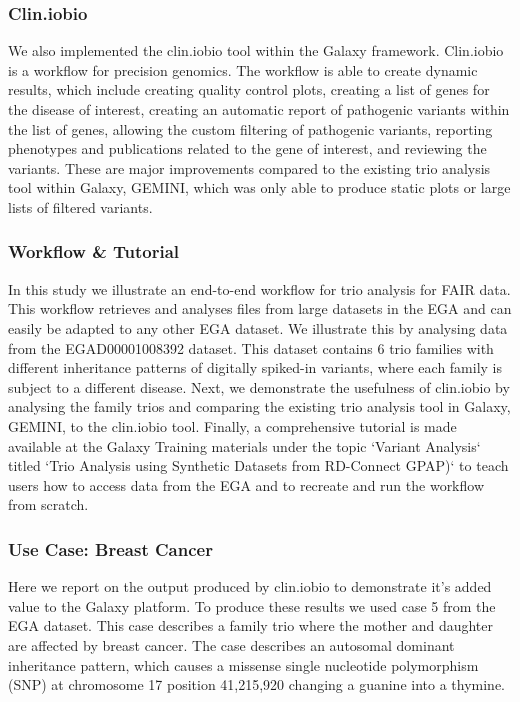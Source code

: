 \subsubsection*{Clin.iobio}
We also implemented the clin.iobio tool within the Galaxy framework. Clin.iobio is a workflow for precision genomics. The workflow is able to create dynamic results, which include creating quality control plots, creating a list of genes for the disease of interest, creating an automatic report of pathogenic variants within the list of genes, allowing the custom filtering of pathogenic variants, reporting phenotypes and publications related to the gene of interest, and reviewing the variants. These are major improvements compared to the existing trio analysis tool within Galaxy, GEMINI, which was only able to produce static plots or large lists of filtered variants.

\subsubsection*{Workflow \& Tutorial}
In this study we illustrate an end-to-end workflow for trio analysis for FAIR data. This workflow retrieves and analyses files from large datasets in the EGA and can easily be adapted to any other EGA dataset. We illustrate this by analysing data from the EGAD00001008392 \cite{egad} dataset. This dataset contains 6 trio families with different inheritance patterns of digitally spiked-in variants, where each family is subject to a different disease. Next, we demonstrate the usefulness of clin.iobio by analysing the family trios and comparing the existing trio analysis tool in Galaxy, GEMINI, to the clin.iobio tool. Finally, a comprehensive tutorial is made available at the Galaxy Training materials \cite{GTN} under the topic `Variant Analysis` titled `Trio Analysis using Synthetic Datasets from RD-Connect GPAP)` \cite{tutorial} to teach users how to access data from the EGA and to recreate and run the workflow from scratch.

\subsubsection*{Use Case: Breast Cancer}
Here we report on the output produced by clin.iobio to demonstrate it's added value to the Galaxy platform. To produce these results we used case 5 from the EGA dataset. This case describes a family trio where the mother and daughter are affected by breast cancer. The case describes an autosomal dominant inheritance pattern, which causes a missense single nucleotide polymorphism (SNP) at chromosome 17 position 41,215,920 changing a guanine into a thymine. \cite{egad} 

